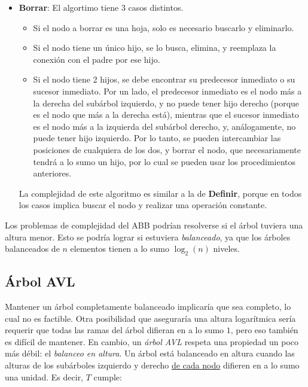 \documentclass{article}
\begin{document}
\begin{itemize}
    \item \textbf{Borrar}: El algortimo tiene 3 casos distintos.
          \begin{itemize}
              \item Si el nodo a borrar es una hoja, solo es necesario buscarlo y eliminarlo.
              \item Si el nodo tiene un único hijo, se lo busca, elimina, y reemplaza la conexión con el padre por ese hijo.
              \item Si el nodo tiene 2 hijos, se debe encontrar su predecesor inmediato o su sucesor inmediato. Por un lado, el predecesor inmediato es el nodo más a la derecha del subárbol izquierdo, y no puede tener hijo derecho (porque es el nodo que más a la derecha está), mientras que el sucesor inmediato es el nodo más a la izquierda del subárbol derecho, y, análogamente, no puede tener hijo izquierdo. Por lo tanto, se pueden intercambiar las posiciones de cualquiera de los dos, y borrar el nodo, que necesariamente tendrá a lo sumo un hijo, por lo cual se pueden usar los procedimientos anteriores.
          \end{itemize}

          La complejidad de este algoritmo es similar a la de \textbf{Definir}, porque en todos los casos implica buscar el nodo y realizar una operación constante.

\end{itemize}

Los problemas de complejidad del ABB podrían resolverse si el árbol tuviera una altura menor. Esto se podría lograr si estuviera \textit{balanceado}, ya que los árboles balanceados de $n$ elementos tienen a lo sumo $\log_2{(n)}$ niveles.

\subsection{Árbol AVL}
\label{subsec-avl}

Mantener un árbol completamente balanceado implicaría que sea completo, lo cual no es factible. Otra posibilidad que aseguraría una altura logarítmica sería requerir que todas las ramas del árbol difieran en a lo sumo $1$, pero eso también es difícil de mantener. En cambio, un \textit{árbol AVL} respeta una propiedad un poco más débil: el \textit{balanceo en altura}. Un árbol está balanceado en altura cuando las alturas de los subárboles izquierdo y derecho \underline{de cada nodo} difieren en a lo sumo una unidad. Es decir, $T$ cumple:
\end{document}

